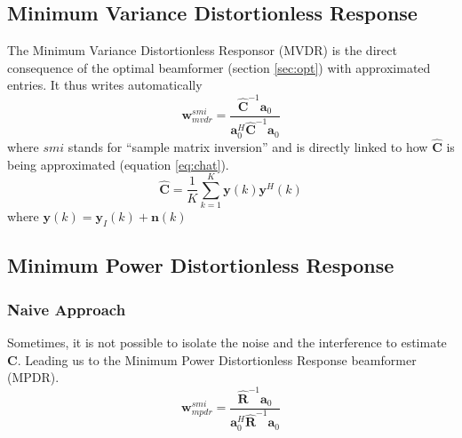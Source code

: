 \documentclass[12pt]{article}
\begin{document}
\subsection{Minimum Variance Distortionless Response}
The Minimum Variance Distortionless Responsor (MVDR) is the direct consequence of the optimal beamformer (section \ref{sec:opt}) with approximated entries. It thus writes automatically
\begin{equation}\label{eq:mvdr}
    \mathbf{w}_{mvdr}^{smi} = \frac{\hat{\mathbf{C}}^{-1}\mathbf{a}_0}{\mathbf{a}_0^H\hat{\mathbf{C}}^{-1}\mathbf{a}_0}
\end{equation}
where $smi$ stands for ``sample matrix inversion'' and is directly linked to how $\hat{\mathbf{C}}$ is being approximated (equation \ref{eq:chat}).
\begin{equation}\label{eq:chat}
    \hat{\mathbf{C}} = \frac{1}{K}\sum_{k=1}^K \mathbf{y}(k)\mathbf{y}^H(k)
\end{equation}
where $\mathbf{y}(k) = \mathbf{y}_I(k)+\mathbf{n}(k)$
\subsection{Minimum Power Distortionless Response}
\subsubsection{Naive Approach}
Sometimes, it is not possible to isolate the noise and the interference to estimate $\mathbf{C}$. Leading us to the Minimum Power Distortionless Response beamformer (MPDR).
\begin{equation}\label{eq:mpdr}
    \mathbf{w}_{mpdr}^{smi} = \frac{\hat{\mathbf{R}}^{-1}\mathbf{a}_0}{\mathbf{a}_0^H\hat{\mathbf{R}}^{-1}\mathbf{a}_0}
\end{equation}
\end{document}
